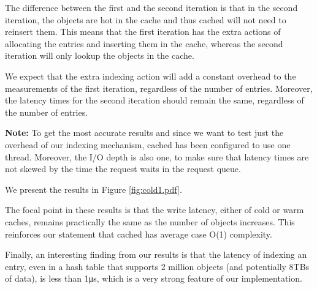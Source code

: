 The difference between the first and the second iteration is that in the second 
iteration, the objects are hot in the cache and thus cached will not need to 
reinsert them. This means that the first iteration has the extra actions of 
allocating the entries and inserting them in the cache, whereas the second 
iteration will only lookup the objects in the cache.

We expect that the extra indexing action will add a constant overhead to the 
measurements of the first iteration, regardless of the number of entries.
Moreover, the latency times for the second iteration should remain the same, 
regardless of the number of entries.

\textbf{Note:} To get the most accurate results and since we want to test just 
the overhead of our indexing mechanism, cached has been configured to use one 
thread.  Moreover, the I/O depth is also one, to make sure that latency times 
are not skewed by the time the request waits in the request queue.

We present the results in Figure \ref{fig:cold1.pdf}.


The focal point in these results is that the write latency, either of cold or 
warm caches, remains practically the same as the number of objects increases.  
This reinforces our statement that cached has average case O(1) complexity.

Finally, an interesting finding from our results is that the latency of 
indexing an entry, even in a hash table that supports 2 million objects (and 
potentially 8TBs of data), is less than 1μs, which is a very strong feature of 
our implementation.

\begin{comment}
As a side note, we observe a constant decrease in writelatency as the number of 
objects increase this is not something that should be attributed to our 
implementation. (explain that we have used a hash table that holds 2million 
objects, so it is not mapped to our process's address space. When more objects 
are indexed, the hash table becomes fuller and the latency of mmap()s is 
equally distributed to the objects. Else, the hash table is more scarce but the 
same blocks are hit, albeit not fully written, and thus the mmap latency is the 
same but distributed to less objects.)
\end{comment}
